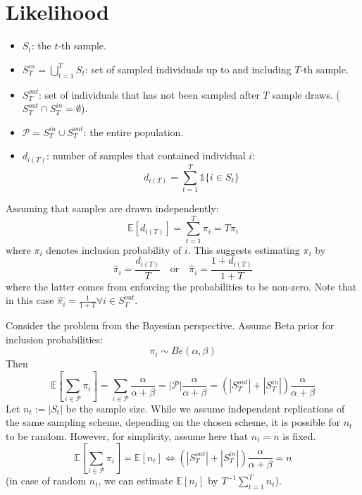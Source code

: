 \documentclass[a4paper, 12pt]{article}
\begin{document}
\section{Likelihood}
\begin{itemize}
    \item $S_t$: the $t$-th sample.
    \item $S_T^{in} = \bigcup \limits_{t=1}^{T} S_t$: set of sampled individuals up to and including $T$-th sample.
    \item $S_T^{out}$: set of individuals that has not been sampled after $T$ sample draws. ($S_T^{out} \cap S_T^{in} = \emptyset$).
    \item $\mathcal{P} = S_T^{in} \cup S_T^{out}$: the entire population.
    \item $d_{i(T)}$: number of samples that contained individual $i$:
    \begin{equation*}
        d_{i(T)} = \sum_{t=1}^T \mathds{1}\{i \in S_t \}
    \end{equation*}
\end{itemize}
Assuming that samples are drawn independently:
\begin{equation*}
    \mathbb{E}[d_{i(T)}] = \sum_{t = 1}^T \pi_i = T\pi_i
\end{equation*}
where $\pi_i$ denotes inclusion probability of $i$. This suggests estimating $\pi_i$ by
\begin{equation} \label{eq:1}
    \hat{\pi}_i = \frac{d_{i(T)}}{T} \quad \text{or} \quad \hat{\pi}_i = \frac{1 + d_{i(T)}}{1 + T}
\end{equation}
where the latter comes from enforcing the probabilities to be non-zero. Note that in this case $\hat{\pi_i} = \frac{1}{1 + T} \forall i \in S_T^{out}$.

Consider the problem from the Bayesian perspective. Assume Beta prior for inclusion probabilities:
\begin{equation*}
    \pi_i \sim Be(\alpha, \beta)
\end{equation*}
Then
\begin{equation*}
    \mathbb{E}[\sum_{i \in \mathcal{P}} \pi_i] = \sum_{i \in \mathcal{P}} \frac{\alpha}{\alpha + \beta} = |\mathcal{P}| \frac{\alpha}{\alpha + \beta} = (|S_T^{out}| + |S_T^{in}|) \frac{\alpha}{\alpha + \beta}
\end{equation*}
Let $n_t := |S_t|$ be the sample size. While we assume independent replications of the same sampling scheme, depending on the chosen scheme, it is possible for $n_t$ to be random. However, for simplicity, assume here that $n_t = n$ is fixed.
\begin{equation} \label{eq:2}
    \mathbb{E}[\sum_{i \in \mathcal{P}} \pi_i] = \mathbb{E}[n_t]
    \Leftrightarrow (|S_T^{out}| + |S_T^{in}|) \frac{\alpha}{\alpha + \beta} = n
\end{equation}
(in case of random $n_t$, we can estimate $\mathbb{E}[n_t]$ by $T^{-1} \sum_{t=1}^T n_t$).
\end{document}
